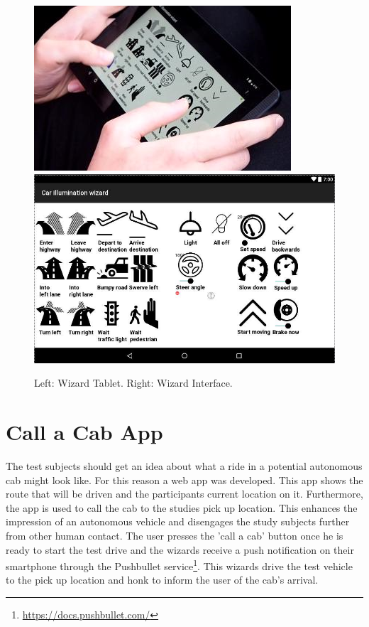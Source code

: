 \begin{figure}
    \includegraphics[width=\textwidth]{fig/WizardHands}\hfill\includegraphics[width=\textwidth]{fig/IlluminationWizard-.JPG}
    \caption[Wizard Tab]{Left: Wizard Tablet. 
   Right: Wizard Interface.}
    \label{fig:wizard}
\end{figure}

\section{Call a Cab App}
\label{sec:capp}
The test subjects should get an idea about what a ride in a potential autonomous cab might look like. For this reason a web app was developed. This app shows the route that will be driven and the participants current location on it. Furthermore, the app is used to call the cab to the studies pick up location. This enhances the impression of an autonomous vehicle and disengages the study subjects further from other human contact. The user presses the 'call a cab' button once he is ready to start the test drive and the wizards receive a push notification on their smartphone through the Pushbullet service\footnote{\url{https://docs.pushbullet.com/}}. This wizards drive the test vehicle to the pick up location and honk to inform the user of the cab's arrival. 

